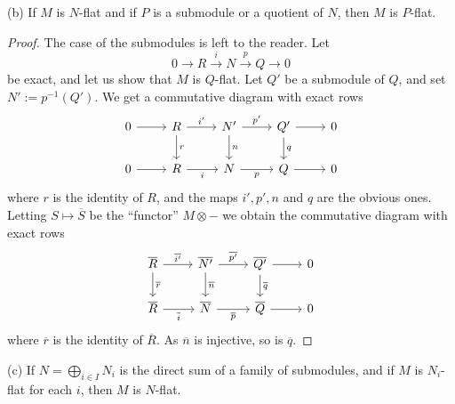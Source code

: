 \documentclass[parskip=half,fontsize=12pt]{scrartcl}%
\begin{document}
(b) If $M$ is $N$-flat and if $P$ is a submodule or a quotient of $N$, then $M$ is $P$-flat.%

\begin{proof} 
The case of the submodules is left to the reader. Let 
$$
0\to R\xrightarrow iN\xrightarrow pQ\to0
$$ 
be exact, and let us show that $M$ is $Q$-flat. Let $Q'$ be a submodule of $Q$, and set $N':=p^{-1}(Q')$. We get a commutative diagram with exact rows
$$
\begin{tikzcd}
0\ar[r]&R\ar[d,"r"]\ar[r,"i'"]&N'\ar[d,"n"]\ar[r,"p'"]& Q'\ar[d,"q"]\ar[r]&0\\ 
0\ar[r]&R\ar[r,"i"']&N\ar[r,"p"']& Q\ar[r]&0
\end{tikzcd}
$$ 
where $r$ is the identity of $R$, and the maps $i',p',n$ and $q$ are the obvious ones. Letting $S\mapsto\overline S$ be the ``functor'' $M\otimes-$ we obtain the commutative diagram with exact rows
$$
\begin{tikzcd}
\overline R\ar[d,"\overline r"]\ar[r,"\overline{i'}"]&\overline{N'}\ar[d,"\overline n"]\ar[r,"\overline{p'}"]& \overline{Q'}\ar[d,"\overline q"]\ar[r]&0\\ 
\overline R\ar[r,"\overline i"']&\overline N\ar[r,"\overline p"']& \overline Q\ar[r]&0
\end{tikzcd}
$$ 
where $\overline r$ is the identity of $\overline R$. As $\overline n$ is injective, so is $\overline q$. 
\end{proof}

(c) If $N=\bigoplus_{i\in I}N_i$ is the direct sum of a family of submodules, and if $M$ is $N_i$-flat for each $i$, then $M$ is $N$-flat.%
\end{document}
